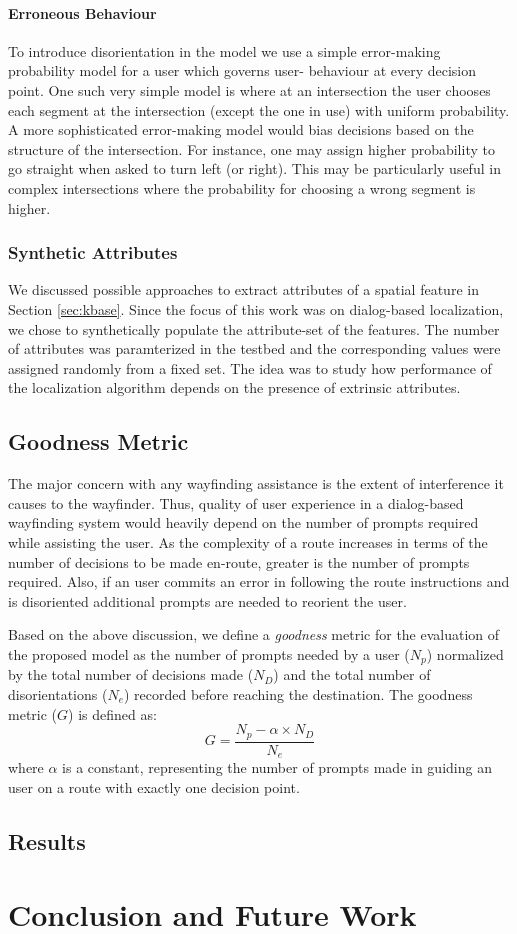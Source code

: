 \documentclass{iitkthesis}
\begin{document}
  \subsubsection*{Erroneous Behaviour}
To introduce disorientation in the model we use 
a simple error-making probability model for a user which governs user-
behaviour at every decision point. One such very simple model is
where at an intersection the user chooses each segment at 
the intersection (except the one in use) with uniform 
probability. A more sophisticated error-making model would bias decisions 
based on the structure of the intersection. For instance, one may assign 
higher probability to go straight when asked to turn left (or right). 
This may be particularly useful in complex intersections where the 
probability for choosing a wrong segment is higher. 
  \subsection{Synthetic Attributes}
We discussed possible approaches to extract attributes of a spatial 
feature in Section \ref{sec:kbase}.  Since the focus of this 
work was on dialog-based localization, we chose to synthetically populate 
the attribute-set of the features. The number of attributes was 
paramterized in the testbed and the corresponding values were assigned 
randomly from a fixed set. The idea was to study how performance of the 
localization algorithm depends on the presence of extrinsic attributes. 
 \section{Goodness Metric}
The major concern with any wayfinding assistance is the extent of 
interference it causes to the wayfinder. Thus, quality of user experience 
in a dialog-based wayfinding system would heavily depend on the 
number of prompts required while assisting the user. As the complexity of 
a route increases in terms of the number of decisions to be made en-route, 
greater is the number of prompts required. Also, if an user 
commits an error in following the route instructions and is disoriented
additional prompts are needed to reorient the user. 

Based on the above discussion, we define a \textit{goodness} metric for the 
evaluation of the proposed model as the number of prompts 
needed by a user ($N_p$) normalized by the total number of decisions 
made ($N_D$) and the total number of disorientations ($N_e$) recorded 
before reaching the destination. The goodness metric ($G$) is defined 
as: 
\[\displaystyle G = \frac{N_p - \alpha \times N_D}{N_e}\]  
where $\alpha$ is a constant, representing the number of prompts made in 
guiding an user on a route with exactly one decision point.
 \section{Results}
 \chapter{Conclusion and Future Work}


\end{document}
